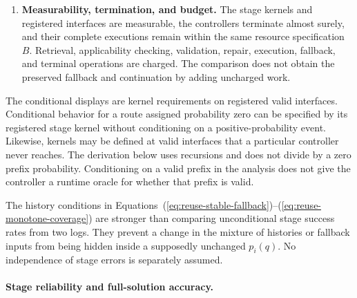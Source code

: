 \documentclass[10pt]{article} %
\renewcommand{\eqref}[1]{\textup{(\ref{#1})}}
\providecommand{\1}{\mathbf{1}}  %
\theoremstyle{remark}
\theoremstyle{definition}
\begin{document}
\begin{enumerate}[label=(\roman*),itemsep=3pt,topsep=3pt]
\item \textbf{Measurability, termination, and budget.}
The stage kernels and registered interfaces are measurable, the
controllers terminate almost surely, and their complete executions
remain within the same resource specification $B$. Retrieval,
applicability checking, validation, repair, execution, fallback, and
terminal operations are charged. The comparison does not obtain the
preserved fallback and continuation by adding uncharged work.

\end{enumerate}

The conditional displays are kernel requirements on registered valid
interfaces. Conditional behavior for a route assigned probability zero
can be specified by its registered stage kernel without conditioning on
a positive-probability event. Likewise, kernels may be defined at valid
interfaces that a particular controller never reaches. The derivation below
uses recursions and does not divide by a zero prefix probability.
Conditioning on a valid prefix in the analysis does not give the
controller a runtime oracle for whether that prefix is valid.

The history conditions in
Equations~\eqref{eq:reuse-stable-fallback}--\eqref{eq:reuse-monotone-coverage}
are stronger than comparing unconditional stage success rates from two
logs. They prevent a change in the mixture of histories or fallback
inputs from being hidden inside a supposedly unchanged $p_i(q)$.
No independence of stage errors is separately assumed.

\paragraph{Stage reliability and full-solution accuracy.}
\end{document}
